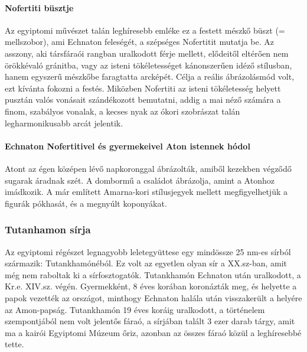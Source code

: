 \paragraph{Nofertiti büsztje}
Az egyiptomi művészet talán leghíresebb emléke ez a festett mészkő büszt (= mellszobor), ami Echnaton feleségét, a szépséges Nofertitit mutatja be. Az asszony, aki társfáraói rangban uralkodott férje mellett, elődeitől eltérően nem örökkévaló gránitba, vagy az isteni tökéletességet kánonszerűen idéző stílusban, hanem egyszerű mészkőbe faragtatta arcképét. Célja a reális ábrázolásmód volt, ezt kívánta fokozni a festés. Miközben Nofertiti az isteni tökéletesség helyett pusztán valós vonásait szándékozott bemutatni, addig a mai néző számára a finom, szabályos vonalak, a kecses nyak az ókori szobrászat talán legharmonikusabb arcát jelentik.


\begin{figure}
\end{figure}

\paragraph{Echnaton Nofertitivel és gyermekeivel Aton istennek hódol}
Atont az égen középen lévő napkoronggal ábrázolták, amiből kezekben végződő sugarak áradnak szét. A dombormű a családot ábrázolja, amint a Atonhoz imádkozik. A már említett Amarna-kori stílusjegyek mellett megfigyelhetjük a figurák pókhasát, és a megnyúlt koponyákat.

\subsubsection*{Tutanhamon sírja}
Az egyiptomi régészet legnagyobb leletegyüttese egy mindössze 25 nm-es sírból származik: Tutankhamónéból. Ez volt az egyetlen olyan sír a XX.sz-ban, amit még nem raboltak ki a sírfosztogatók. Tutankhamón Echnaton után uralkodott, a Kr.e. XIV.sz. végén. Gyermekként, 8 éves korában koronázták meg, és helyette a papok vezették az országot, minthogy Echnaton halála után visszakerült a helyére az Amon-papság. Tutankhamón 19 éves koráig uralkodott, a történelem szempontjából nem volt jelentős fáraó, a sírjában talált 3 ezer darab tárgy, amit ma a kairói Egyiptomi Múzeum őriz, azonban az összes fáraó közül a leghíresebbé tette.

